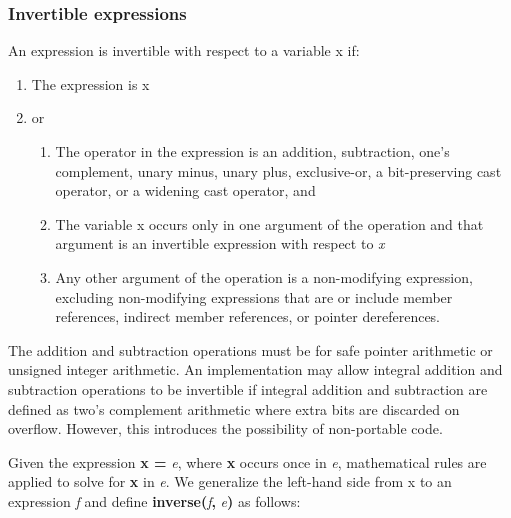\documentclass[]{article}
\begin{document}
\subsubsection{\texorpdfstring{\protect\hypertarget{ux5fToc435434958}{}{\protect\hypertarget{ux5fToc437460785}{}{\protect\hypertarget{ux5fToc440445464}{}{\protect\hypertarget{ux5fToc440449246}{}{\protect\hypertarget{ux5fToc440551896}{}{}}}}}Invertible
expressions}{Invertible expressions}}\label{invertible-expressions}

An expression is invertible with respect to a variable x if:

\begin{enumerate}
\def\labelenumi{\arabic{enumi}.}
\item
  The expression is x
\item
  or

  \begin{enumerate}
  \def\labelenumii{\alph{enumii}.}
  \item
    The operator in the expression is an addition, subtraction, one's
    complement, unary minus, unary plus, exclusive-or, a bit-preserving
    cast operator, or a widening cast operator, and
  \item
    The variable x occurs only in one argument of the operation and that
    argument is an invertible expression with respect to \emph{x}
  \item
    Any other argument of the operation is a non-modifying expression,
    excluding non-modifying expressions that are or include member
    references, indirect member references, or pointer dereferences.
  \end{enumerate}
\end{enumerate}

The addition and subtraction operations must be for safe pointer
arithmetic or unsigned integer arithmetic. An implementation may allow
integral addition and subtraction operations to be invertible if
integral addition and subtraction are defined as two's complement
arithmetic where extra bits are discarded on overflow. However, this
introduces the possibility of non-portable code.

Given the expression \textbf{x =} \emph{e}, where \textbf{x} occurs once
in \emph{e}, mathematical rules are applied to solve for \textbf{x} in
\emph{e}. We generalize the left-hand side from x to an expression
\emph{f} and define \textbf{inverse(}\emph{f}\textbf{,}
\emph{e}\textbf{)} as follows:
\end{document}
